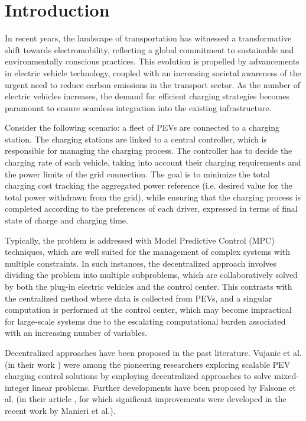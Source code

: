 \section{Introduction}
\label{sec:introduction}
In recent years, the landscape of transportation has witnessed a transformative shift towards electromobility, reflecting a global commitment to sustainable and environmentally conscious practices. This evolution is propelled by advancements in electric vehicle technology, coupled with an increasing societal awareness of the urgent need to reduce carbon emissions in the transport sector. As the number of electric vehicles increases, the demand for efficient charging strategies becomes paramount to ensure seamless integration into the existing infrastructure.

Consider the following scenario: a fleet of PEVs are connected to a charging station. The charging stations are linked to a central controller, which is responsible for managing the charging process. The controller has to decide the charging rate of each vehicle, taking into account their charging requirements and the power limits of the grid connection. The goal is to minimize the total charging cost tracking the aggregated power reference (i.e. desired value for the total power withdrawn from the grid), while ensuring that the charging process is completed according to the preferences of each driver, expressed in terms of final state of charge and charging time.

Typically, the problem is addressed with Model Predictive Control (MPC) techniques, which are well suited for the management of complex systems with multiple constraints. In such instances, the decentralized approach involves dividing the problem into multiple subproblems, which are collaboratively solved by both the plug-in electric vehicles and the control center. This contrasts with the centralized method where data is collected from PEVs, and a singular computation is performed at the control center, which may become impractical for large-scale systems due to the escalating computational burden associated with an increasing number of variables.

Decentralized approaches have been proposed in the past literature. 
Vujanic et al. (in their work \autocite{VUJANIC2016144}) were among the pioneering researchers exploring scalable PEV charging control solutions by employing decentralized approaches to solve mixed-integer linear problems. Further developments have been proposed by Falsone et al. (in their article \autocite{FALSONE2019141}, for which significant improvements were developed in the recent work \autocite{MANIERI20235919} by Manieri et al.).

